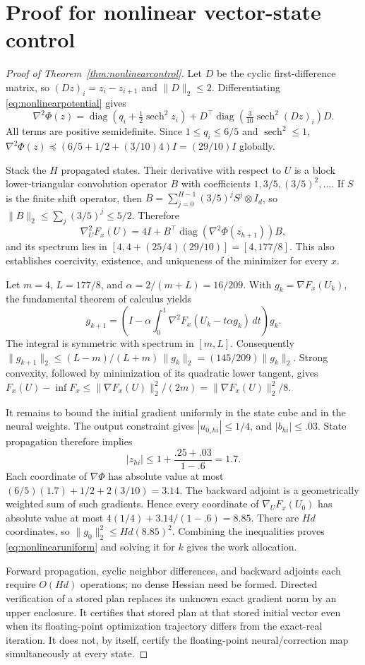 \section{Proof for nonlinear vector-state control}\label{app:nonlinearproof}
\begin{proof}[Proof of Theorem~\ref{thm:nonlinearcontrol}]
Let $D$ be the cyclic first-difference matrix, so $(Dz)_i=z_i-z_{i+1}$ and $\|D\|_2\leq2$. Differentiating \eqref{eq:nonlinearpotential} gives
\[
 \nabla^2\Phi(z)=\operatorname{diag}(q_i+\tfrac12\operatorname{sech}^2z_i)
 +D^\top\operatorname{diag}(\tfrac3{10}\operatorname{sech}^2(Dz)_i)D.
\]
All terms are positive semidefinite. Since $1\leq q_i\leq6/5$ and $\operatorname{sech}^2\leq1$,
$\nabla^2\Phi(z)\preceq(6/5+1/2+(3/10)4)I=(29/10)I$ globally.

Stack the $H$ propagated states. Their derivative with respect to $U$ is a block lower-triangular convolution operator $B$ with coefficients $1,3/5,(3/5)^2,\ldots$. If $S$ is the finite shift operator, then $B=\sum_{j=0}^{H-1}(3/5)^j S^j\otimes I_d$, so $\|B\|_2\leq\sum_j(3/5)^j\leq5/2$. Therefore
\[
 \nabla_U^2F_x(U)=4I+B^\top\operatorname{diag}(\nabla^2\Phi(z_{h+1}))B,
\]
and its spectrum lies in $[4,4+(25/4)(29/10)]=[4,177/8]$. This also establishes coercivity, existence, and uniqueness of the minimizer for every $x$.

Let $m=4$, $L=177/8$, and $\alpha=2/(m+L)=16/209$. With $g_k=\nabla F_x(U_k)$, the fundamental theorem of calculus yields
\[
 g_{k+1}=\left(I-\alpha\int_0^1\nabla^2F_x(U_k-t\alpha g_k)\,dt\right)g_k.
\]
The integral is symmetric with spectrum in $[m,L]$. Consequently
$\|g_{k+1}\|_2\leq (L-m)/(L+m)\,\|g_k\|_2=(145/209)\|g_k\|_2$.
Strong convexity, followed by minimization of its quadratic lower tangent, gives
$F_x(U)-\inf F_x\leq\|\nabla F_x(U)\|_2^2/(2m)=\|\nabla F_x(U)\|_2^2/8$.

It remains to bound the initial gradient uniformly in the state cube and in the neural weights. The output constraint gives $|u_{0,hi}|\leq1/4$, and $|b_{hi}|\leq.03$. State propagation therefore implies
\[
 |z_{hi}|\leq1+\frac{.25+.03}{1-.6}=1.7.
\]
Each coordinate of $\nabla\Phi$ has absolute value at most
$(6/5)(1.7)+1/2+2(3/10)=3.14$. The backward adjoint is a geometrically weighted sum of such gradients. Hence every coordinate of $\nabla_U F_x(U_0)$ has absolute value at most
$4(1/4)+3.14/(1-.6)=8.85$. There are $Hd$ coordinates, so
$\|g_0\|_2^2\leq Hd(8.85)^2$. Combining the inequalities proves \eqref{eq:nonlinearuniform} and solving it for $k$ gives the work allocation.

Forward propagation, cyclic neighbor differences, and backward adjoints each require $O(Hd)$ operations; no dense Hessian need be formed. Directed verification of a stored plan replaces its unknown exact gradient norm by an upper enclosure. It certifies that stored plan at that stored initial vector even when its floating-point optimization trajectory differs from the exact-real iteration. It does not, by itself, certify the floating-point neural/correction map simultaneously at every state.
\end{proof}

